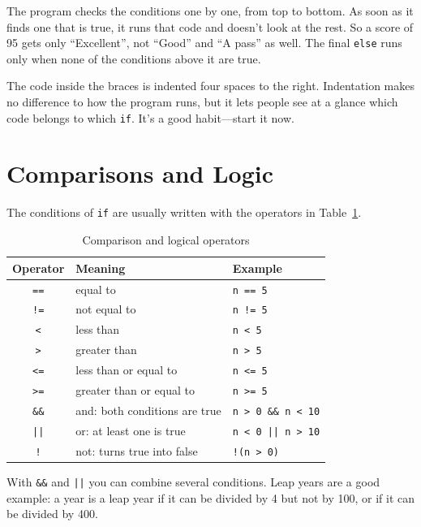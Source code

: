 \inputminted[linenos=false]{text}{code/en/ch02/out/grade.txt}

The program checks the conditions one by one, from top to bottom. As soon as it finds one that is true, it runs that code and doesn't look at the rest. So a score of 95 gets only ``Excellent'', not ``Good'' and ``A pass'' as well. The final \texttt{else} runs only when none of the conditions above it are true.

The code inside the braces is indented four spaces to the right. Indentation makes no difference to how the program runs, but it lets people see at a glance which code belongs to which \texttt{if}. It's a good habit---start it now.

\section{Comparisons and Logic}
\label{sec:logic}

The conditions of \texttt{if} are usually written with the operators in Table~\ref{tab:compare-ops}.

\begin{table}[htbp]
  \centering
  \caption{Comparison and logical operators}
  \label{tab:compare-ops}
  \begin{tabular}{cll}
    \toprule
    Operator & Meaning & Example \\
    \midrule
    \texttt{==} & equal to     & \texttt{n == 5} \\
    \texttt{!=} & not equal to & \texttt{n != 5} \\
    \texttt{<}  & less than    & \texttt{n < 5} \\
    \texttt{>}  & greater than & \texttt{n > 5} \\
    \texttt{<=} & less than or equal to    & \texttt{n <= 5} \\
    \texttt{>=} & greater than or equal to & \texttt{n >= 5} \\
    \midrule
    \texttt{\&\&} & and: both conditions are true     & \texttt{n > 0 \&\& n < 10} \\
    \texttt{||}   & or: at least one is true          & \texttt{n < 0 || n > 10} \\
    \texttt{!}    & not: turns true into false        & \texttt{!(n > 0)} \\
    \bottomrule
  \end{tabular}
\end{table}

With \texttt{\&\&} and \texttt{||} you can combine several conditions. Leap years are a good example: a year is a leap year if it can be divided by 4 but not by 100, or if it can be divided by 400.


